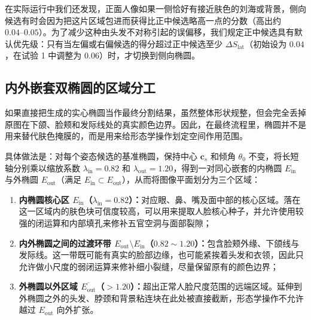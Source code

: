 在实际运行中我们还发现，正面人像如果一侧恰好有接近肤色的刘海或背景，侧向候选有时会因为把这片区域包进而获得比正中候选略高一点的分数（高出约 $0.04\text{--}0.05$）。为了减少这种由头发不对称引起的误偏移，我们规定正中候选具有默认优先级：只有当左偏或右偏候选的得分超过正中候选至少 $\Delta S_{\text{lat}}$（初始设为 $0.04$，在试验 1 中调整为 $0.06$）时，才切换到侧向椭圆。

\subsection{内外嵌套双椭圆的区域分工}

如果直接把生成的实心椭圆当作最终分割结果，虽然整体形状规整，但会完全丢掉原图在下颌、脸颊和发际线处的真实颜色边界。因此，在最终流程里，椭圆并不是用来替代肤色掩膜的，而是用来给形态学操作划定空间作用范围。

具体做法是：对每个姿态候选的基准椭圆，保持中心 $\mathbf{c}_s$ 和倾角 $\theta_0$ 不变，将长短轴分别乘以缩放系数 $\lambda_{\text{in}}=0.82$ 和 $\lambda_{\text{out}}=1.20$，得到一对同心嵌套的内椭圆 $E_{\text{in}}$ 与外椭圆 $E_{\text{out}}$（满足 $E_{\text{in}}\subset E_{\text{out}}$），从而将图像平面划分为三个区域：
\begin{enumerate}
\item \textbf{内椭圆核心区 $E_{\text{in}}$（$\lambda_{\text{in}}=0.82$）：}对应眼、鼻、嘴及面中部的核心区域。落在这一区域内的肤色块可信度较高，可以用来提取人脸核心种子，并允许使用较强的闭运算和内部填孔来修补五官空洞与面部裂隙；
\item \textbf{内外椭圆之间的过渡环带 $E_{\text{out}}\setminus E_{\text{in}}$（$0.82\sim 1.20$）：}包含脸颊外缘、下颌线与发际线。这一带既可能有真实的脸部边缘，也可能紧挨着头发和衣领，因此只允许做小尺度的弱闭运算来修补细小裂缝，尽量保留原有的颜色边界；
\item \textbf{外椭圆以外区域 $\overline{E_{\text{out}}}$（$>1.20$）：}超出正常人脸尺度范围的远端区域。延伸到外椭圆之外的头发、脖颈和背景粘连块在此处被直接截断，形态学操作不允许越过 $E_{\text{out}}$ 向外扩张。
\end{enumerate}
